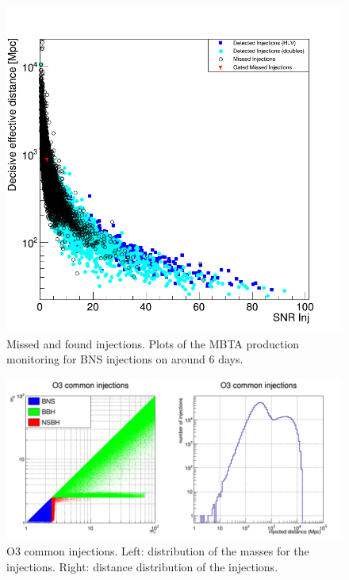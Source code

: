 

\begin{figure}
  \centering
  \includegraphics[width=0.5\linewidth]{sectionSelection/plotsOther/inj_recovery_snr_chunk26.png}
  \caption{Missed and found injections. Plots of the MBTA production monitoring for BNS injections on around 6 days.}
  \label{fig:injections_recovery}
\end{figure}


\begin{figure}
  \centering
  \includegraphics[width=\linewidth]{sectionSelection/plotsOther/cCommonInj.png}
  \caption{O3 common injections. Left: distribution of the masses for the injections. Right: distance distribution of the injections.}
  \label{fig:common_inj}
\end{figure}


